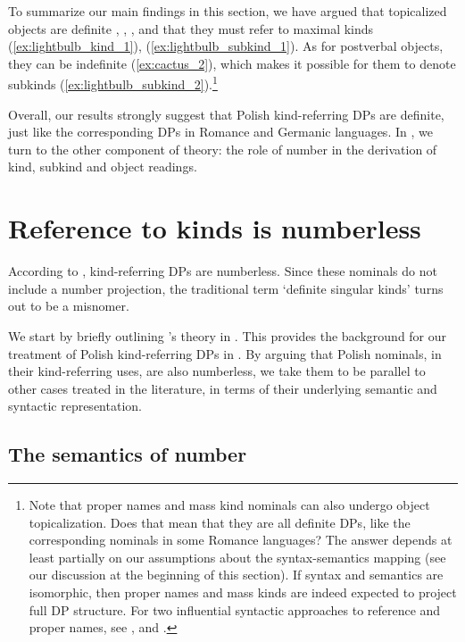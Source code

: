 \documentclass[output=paper,
colorlinks,
citecolor=brown,
newtxmath
]{langscibook}
\begin{document}
To summarize our main findings in this section, we have argued that topicalized objects are definite , , , and that they must refer to maximal kinds (\ref{ex:lightbulb_kind_1}), (\ref{ex:lightbulb_subkind_1}). As for postverbal objects, they  can be indefinite (\ref{ex:cactus_2}), which makes it possible for them to denote subkinds (\ref{ex:lightbulb_subkind_2}).\footnote{Note that proper names and mass kind nominals can also undergo object topicalization. Does that mean that they are all definite DPs, like the corresponding nominals in some Romance languages? The answer depends at least partially on our assumptions about the syntax-semantics mapping (see our discussion at the beginning of this section). If syntax and semantics are isomorphic, then proper names and mass kinds are indeed expected to project full DP structure. For two influential syntactic approaches to reference and proper names, see \citet{Longobardi1994,Longobardi2001,Longobardi2005}, and \cite{Borer2005}.}

Overall, our results strongly suggest that Polish kind-referring DPs are definite, just like the corresponding DPs in Romance and Germanic languages. In , we turn to the other component of  theory: the role of number in the derivation of kind, subkind and object readings.


\section{Reference to kinds is numberless} \label{sec:3-nominals_numberless}

According to \cite{Borik.Espinal2012, Borik.Espinal2015}, kind-referring DPs are numberless. Since these nominals do not include a number projection, the traditional term `definite singular kinds' turns out to be a misnomer.

We start by briefly outlining \citeauthor{Borik.Espinal2012}'s theory in . This provides the background for our treatment of Polish kind-referring DPs in . By arguing that Polish nominals, in their kind-referring uses, are also numberless, we take them to be parallel to other cases treated in the literature, in terms of their underlying semantic and syntactic representation.

\subsection{The semantics of number}
\label{sec:sem_num}
\end{document}
